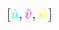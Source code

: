 \documentclass[preview]{standalone}
\begin{document}
$\left[\textcolor[HTML]{00FFFF}{\hat{u}}, \textcolor[HTML]{FF00FF}{\hat{v}}, \textcolor[HTML]{FFFF00}{\hat{w}}\right]$
\end{document}
